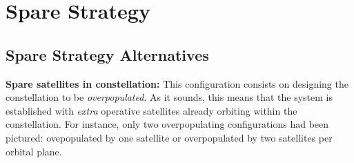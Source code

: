 \section{Spare Strategy}

\subsection{Spare Strategy Alternatives}

\textbf{Spare satellites in constellation:}
\newline
This configuration consists on designing the constellation to be \textit{ overpopulated}. As it sounds, this means that the system is established with \textit{extra} operative satellites already orbiting within the constellation. For instance, only two overpopulating configurations had been pictured: ovepopulated by one satellite or overpopulated by two satellites per orbital plane. 

